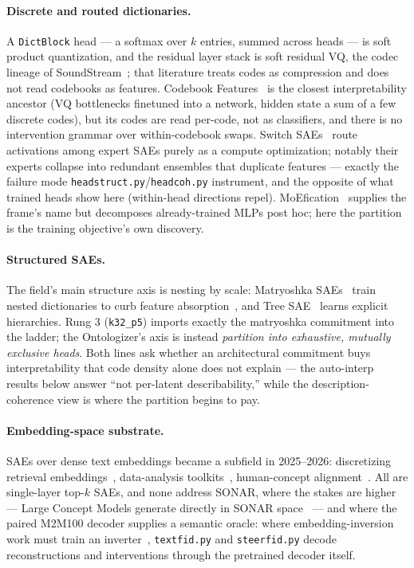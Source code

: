 \documentclass[11pt]{article}
\begin{document}
\paragraph{Discrete and routed dictionaries.}
A \texttt{DictBlock} head --- a softmax over $k$ entries, summed across
heads --- is soft product quantization, and the residual layer stack is
soft residual VQ, the codec lineage of SoundStream~\cite{zeghidour2021};
that literature treats codes as compression and does not read codebooks as
features. Codebook Features~\cite{tamkin2023} is the closest
interpretability ancestor (VQ bottlenecks finetuned into a network, hidden
state a sum of a few discrete codes), but its codes are read per-code, not
as classifiers, and there is no intervention grammar over within-codebook
swaps. Switch SAEs~\cite{mudide2024} route activations among expert SAEs
purely as a compute optimization; notably their experts collapse into
redundant ensembles that duplicate features --- exactly the failure mode
\texttt{headstruct.py}/\texttt{headcoh.py} instrument, and the opposite of
what trained heads show here (within-head directions repel).
MoEfication~\cite{zhang2022} supplies the frame's name but decomposes
already-trained MLPs post hoc; here the partition is the training
objective's own discovery.

\paragraph{Structured SAEs.}
The field's main structure axis is nesting by scale: Matryoshka
SAEs~\cite{bussmann2025} train nested dictionaries to curb feature
absorption~\cite{chanin2024}, and Tree SAE~\cite{cao2026} learns explicit
hierarchies. Rung 3 (\texttt{k32\_p5}) imports exactly the matryoshka
commitment into the ladder; the Ontologizer's axis is instead
\emph{partition into exhaustive, mutually exclusive heads}. Both lines ask
whether an architectural commitment buys interpretability that code
density alone does not explain --- the auto-interp results below answer
``not per-latent describability,'' while the description-coherence view is
where the partition begins to pay.

\paragraph{Embedding-space substrate.}
SAEs over dense text embeddings became a subfield in 2025--2026:
discretizing retrieval embeddings~\cite{park2025}, data-analysis
toolkits~\cite{jiang2025}, human-concept alignment~\cite{shin2026}. All
are single-layer top-$k$ SAEs, and none address SONAR, where the stakes
are higher --- Large Concept Models generate directly in SONAR
space~\cite{lcm2024} --- and where the paired M2M100 decoder supplies a
semantic oracle: where embedding-inversion work must train an
inverter~\cite{morris2023}, \texttt{textfid.py} and \texttt{steerfid.py}
decode reconstructions and interventions through the pretrained decoder
itself.
\end{document}
